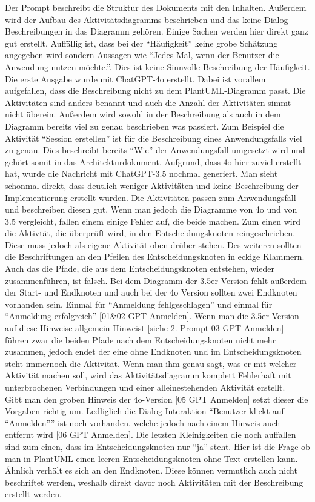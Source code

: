 Der Prompt beschreibt die Struktur des Dokuments mit den Inhalten. Außerdem wird der Aufbau des Aktivitätsdiagramms beschrieben und das keine Dialog Beschreibungen 
in das Diagramm gehören. Einige Sachen werden hier direkt ganz gut erstellt. Auffällig ist, dass bei der ``Häufigkeit'' keine grobe Schätzung angegeben wird sondern 
Aussagen wie ``Jedes Mal, wenn der Benutzer die Anwendung nutzen möchte.''. Dies ist keine Sinnvolle Beschreibung der Häufigkeit.\\

Die erste Ausgabe wurde mit ChatGPT-4o erstellt. Dabei ist vorallem aufgefallen, dass die Beschreibung nicht zu dem PlantUML-Diagramm passt. Die Aktivitäten
sind anders benannt und auch die Anzahl der Aktivitäten simmt nicht überein. Außerdem wird sowohl in der Beschreibung als auch in dem Diagramm bereits 
viel zu genau beschrieben was passiert. Zum Beispiel die Aktivität ``Session erstellen'' ist für die Beschreibung eines Anwendungsfalls viel zu genau.
Dies beschreibt bereits ``Wie'' der Anwendungsfall umgesetzt wird und gehört somit in das Architekturdokument. Aufgrund, dass 4o hier zuviel erstellt hat, 
wurde die Nachricht mit ChatGPT-3.5 nochmal generiert. Man sieht schonmal direkt, dass deutlich weniger Aktivitäten und keine Beschreibung der Implementierung 
erstellt wurden. Die Aktivitäten passen zum Anwendungsfall und beschreiben diesen gut. Wenn man jedoch die Diagramme von 4o und von 3.5 vergleicht,
fallen einem einige Fehler auf, die beide machen. Zum einen wird die Aktivtät, die überprüft wird, in den Entscheidungsknoten reingeschrieben. Diese muss jedoch als eigene 
Aktivität oben drüber stehen. Des weiteren sollten die Beschriftungen an den Pfeilen des Entscheidungsknoten in eckige Klammern. Auch das die Pfade, die 
aus dem Entscheidungsknoten entstehen, wieder zusammenführen, ist falsch. Bei dem Diagramm der 3.5er Version fehlt außerdem der Start- und Endknoten und auch 
bei der 4o Version sollten zwei Endknoten vorhanden sein. Einmal für ``Anmeldung fehlgeschlagen'' und einmal für ``Anmeldung erfolgreich'' [01\&02 GPT Anmelden].
Wenn man die 3.5er Version auf diese Hinweise allgemein Hinweist [siehe 2. Prompt 03 GPT Anmelden] führen zwar die beiden Pfade nach dem Entscheidungsknoten nicht mehr 
zusammen, jedoch endet der eine ohne Endknoten und im Entscheidungsknoten steht immernoch die Aktivität. Wenn man ihm genau sagt, was er mit welcher Aktivität
machen soll, wird das Aktivitätsdiagramm komplett Fehlerhaft mit unterbrochenen Verbindungen und einer alleinestehenden Aktivität erstellt.\\
Gibt man den groben Hinweis der 4o-Version [05 GPT Anmelden] setzt dieser die Vorgaben richtig um. Ledliglich die Dialog Interaktion ``Benutzer klickt auf ``Anmelden''''
ist noch vorhanden, welche jedoch nach einem Hinweis auch entfernt wird [06 GPT Anmelden]. Die letzten Kleinigkeiten die noch auffallen sind zum einen, dass
im Entscheidungsknoten nur ``ja'' steht. Hier ist die Frage ob man in PlantUML einen leeren Entscheidungsknoten ohne Text erstellen kann. Ähnlich 
verhält es sich an den Endknoten. Diese können vermutlich auch nicht beschriftet werden, weshalb direkt davor noch Aktivitäten mit der Beschreibung erstellt
werden.\\

